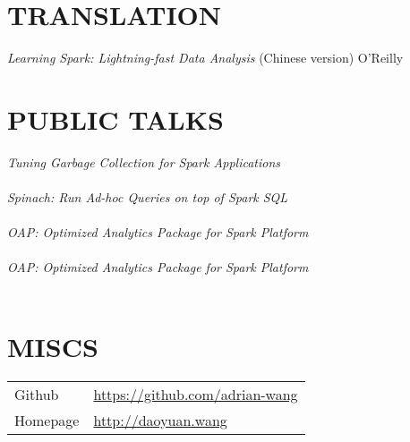 \documentclass[line,margin]{res}
\begin{document}
\begin{resume}
\section{TRANSLATION}
            {\sl Learning Spark: Lightning-fast Data Analysis} (Chinese version) \hfill O'Reilly

\section{PUBLIC TALKS}
            {\sl Tuning Garbage Collection for Spark Applications}\\
                \\
            {\sl Spinach: Run Ad-hoc Queries on top of Spark SQL}\\
                \\
            {\sl OAP: Optimized Analytics Package for Spark Platform}\\
                \\
            {\sl OAP: Optimized Analytics Package for Spark Platform}\\
                \\

\section{MISCS}
            \begin{tabular}{p{}p{}}
            {Github} &\href{https://github.com/adrian-wang}{https://github.com/adrian-wang}\\
            {Homepage} &\href{http://daoyuan.wang}{http://daoyuan.wang}\\
            \end{tabular}
\end{resume}
\end{document}
